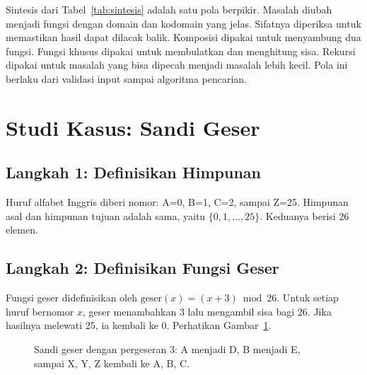 \documentclass[11pt,a4paper]{article}
\begin{document}
Sintesis dari Tabel~\ref{tab:sintesis} adalah satu pola berpikir. Masalah diubah menjadi fungsi dengan domain dan kodomain yang jelas. Sifatnya diperiksa untuk memastikan hasil dapat dilacak balik. Komposisi dipakai untuk menyambung dua fungsi. Fungsi khusus dipakai untuk membulatkan dan menghitung sisa. Rekursi dipakai untuk masalah yang bisa dipecah menjadi masalah lebih kecil. Pola ini berlaku dari validasi input sampai algoritma pencarian.

\section{Studi Kasus: Sandi Geser}

\subsection{Langkah 1: Definisikan Himpunan}

Huruf alfabet Inggris diberi nomor: A=0, B=1, C=2, sampai Z=25. Himpunan asal dan himpunan tujuan adalah sama, yaitu $\{0,1,\ldots,25\}$. Keduanya berisi 26 elemen.

\subsection{Langkah 2: Definisikan Fungsi Geser}

Fungsi geser didefinisikan oleh $\text{geser}(x)=(x+3) \bmod 26$. Untuk setiap huruf bernomor $x$, geser menambahkan 3 lalu mengambil sisa bagi 26. Jika hasilnya melewati 25, ia kembali ke 0. Perhatikan Gambar~\ref{fig:sandi-geser}.

\begin{figure}[H]
	\centering
	\caption{Sandi geser dengan pergeseran 3: A menjadi D, B menjadi E, sampai X, Y, Z kembali ke A, B, C.}
	\label{fig:sandi-geser}
\end{figure}
\end{document}
